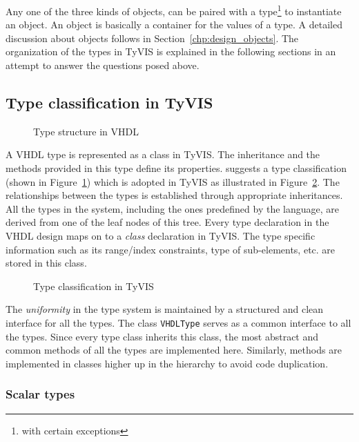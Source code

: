 \documentclass[11pt]{article}
\begin{document}
Any one of the three kinds of objects, can be paired with a
type\footnote{with certain exceptions} to instantiate an object. An
object is basically a container for the values of a type.  A detailed
discussion about objects follows in Section~\ref{chp:design_objects}.
The organization of the types in TyVIS is explained in the following
sections in an attempt to answer the questions posed above.

\subsection{Type classification in TyVIS}

\begin{figure}[htbp]
   \centerline{}
  \caption{Type structure in VHDL}
  \label{fig:VHDLTypes}
\end{figure}

A VHDL type is represented as a \Cpp\/ class in TyVIS.  The
inheritance and the methods provided in this type define its
properties.  \LRM\/ suggests a type classification (shown in
Figure~\ref{fig:VHDLTypes}) which is adopted in TyVIS as illustrated
in Figure~\ref{fig:c++_types}.  The relationships between the types is
established through appropriate inheritances.  All the types in the
system, including the ones predefined by the language, are derived
from one of the leaf nodes of this tree.  Every type declaration in
the VHDL design maps on to a \textit{class} declaration in TyVIS.  The
type specific information such as its range/index constraints, type of
sub-elements, etc. are stored in this class.

\begin{figure}[htbp]
  \centerline{}
  \caption{Type classification in TyVIS}
  \label{fig:c++_types}
\end{figure}

The \textit{uniformity} in the type system is maintained by a
structured and clean interface for all the types.  The class
\texttt{VHDLType} serves as a common interface to all the types.
Since every type class inherits this class, the most abstract and
common methods of all the types are implemented here.  Similarly,
methods are implemented in classes higher up in the hierarchy to avoid
code duplication.

\subsubsection{Scalar types}
\label{sec:scalar_types}
\end{document}
